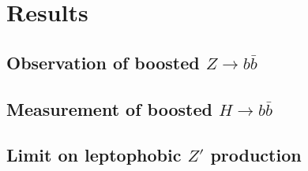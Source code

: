 \chapter{Results}\label{chapter:results}

\section{Observation of boosted $Z\to b\bar{b}$}

\section{Measurement of boosted $H\to b\bar{b}$}

\section{Limit on leptophobic $Z'$ production}
